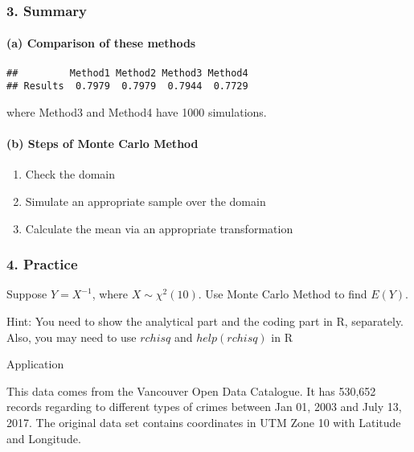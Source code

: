 \documentclass[12pt]{article}
\begin{document}
\hypertarget{summary}{%
\subsubsection{3. Summary}\label{summary}}

\hypertarget{a-comparison-of-these-methods}{%
\paragraph{(a) Comparison of these
methods}\label{a-comparison-of-these-methods}}

\begin{verbatim}
##         Method1 Method2 Method3 Method4
## Results  0.7979  0.7979  0.7944  0.7729
\end{verbatim}

where Method3 and Method4 have 1000 simulations.

\hypertarget{b-steps-of-monte-carlo-method}{%
\paragraph{(b) Steps of Monte Carlo
Method}\label{b-steps-of-monte-carlo-method}}

\begin{enumerate}
\def\labelenumi{\roman{enumi}.}
\tightlist
\item
  Check the domain
\item
  Simulate an appropriate sample over the domain
\item
  Calculate the mean via an appropriate transformation
\end{enumerate}

\hypertarget{practice}{%
\subsubsection{4. Practice}\label{practice}}

Suppose \(Y = X^{-1}\), where \(X \sim \chi^2(10)\). Use Monte Carlo
Method to find \(E(Y)\).

\par

Hint: You need to show the analytical part and the coding part in R,
separately. Also, you may need to use \(rchisq\) and \(help(rchisq)\) in
R

\newpage

Application

This data comes from the Vancouver Open Data Catalogue. It has 530,652
records regarding to different types of crimes between Jan 01, 2003 and
July 13, 2017. The original data set contains coordinates in UTM Zone 10
with Latitude and Longitude. \citep{CrimeInVancouver}
\end{document}
